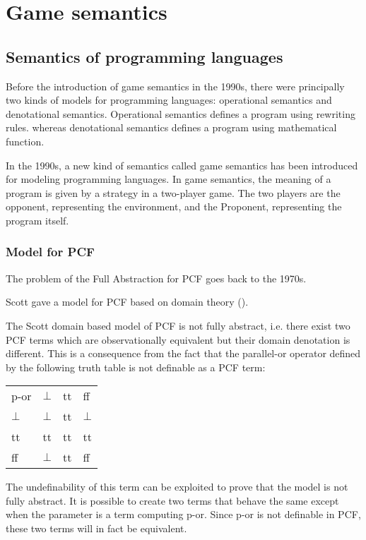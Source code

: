 \chapter{Game semantics}
\section{Semantics of programming languages}

Before the introduction of game semantics in the 1990s, there were
principally two kinds of models for programming languages:
operational semantics and denotational semantics. Operational
semantics defines a program using rewriting rules. whereas
denotational semantics defines a program using mathematical
function.

In the 1990s, a new kind of semantics called game semantics has been
introduced for modeling programming languages. In game semantics,
the meaning of a program is given by a strategy in a two-player
game. The two players are the opponent, representing the
environment, and the Proponent, representing the program itself.


\subsection{Model for PCF}

The problem of the Full Abstraction for PCF goes back to the 1970s.

Scott gave a model for PCF based on domain theory (\cite{scott93}).

The Scott domain based model of PCF is not fully abstract, i.e.
there exist two PCF terms which are observationally equivalent but
their domain denotation is different. This is a consequence from the
fact that the parallel-or operator defined by the following truth
table is not definable as a PCF term:

\begin{tabular}{l|lll}
p-or  & $\bot$ & tt & ff \\
$\bot$ & $\bot$ & tt & $\bot$\\
tt & tt & tt & tt\\
ff & $\bot$ & tt & ff\\
\end{tabular}

The undefinability of this term can be exploited to prove that the
model is not fully abstract. It is possible to create two terms that
behave the same except when the parameter is a term computing p-or.
Since p-or is not definable in PCF, these two terms will in fact be
equivalent.

